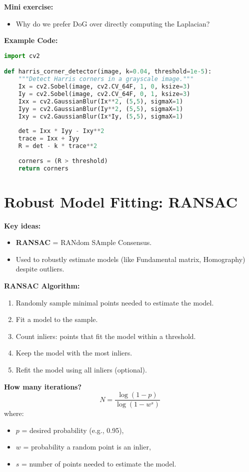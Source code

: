 \documentclass[a4paper,11pt]{article}
\begin{document}
\textbf{Mini exercise:}
\begin{itemize}
    \item Why do we prefer DoG over directly computing the Laplacian?
\end{itemize}

\vspace{1em}

\textbf{Example Code:}
\begin{lstlisting}[language=Python]
import cv2

def harris_corner_detector(image, k=0.04, threshold=1e-5):
    """Detect Harris corners in a grayscale image."""
    Ix = cv2.Sobel(image, cv2.CV_64F, 1, 0, ksize=3)
    Iy = cv2.Sobel(image, cv2.CV_64F, 0, 1, ksize=3)
    Ixx = cv2.GaussianBlur(Ix**2, (5,5), sigmaX=1)
    Iyy = cv2.GaussianBlur(Iy**2, (5,5), sigmaX=1)
    Ixy = cv2.GaussianBlur(Ix*Iy, (5,5), sigmaX=1)
    
    det = Ixx * Iyy - Ixy**2
    trace = Ixx + Iyy
    R = det - k * trace**2
    
    corners = (R > threshold)
    return corners
\end{lstlisting}

\newpage
\section{Robust Model Fitting: RANSAC}

\textbf{Key ideas:}
\begin{itemize}
    \item \textbf{RANSAC} = RANdom SAmple Consensus.
    \item Used to robustly estimate models (like Fundamental matrix, Homography) despite outliers.
\end{itemize}

\textbf{RANSAC Algorithm:}
\begin{enumerate}
    \item Randomly sample minimal points needed to estimate the model.
    \item Fit a model to the sample.
    \item Count inliers: points that fit the model within a threshold.
    \item Keep the model with the most inliers.
    \item Refit the model using all inliers (optional).
\end{enumerate}

\textbf{How many iterations?}
\[
N = \frac{\log(1 - p)}{\log(1 - w^s)}
\]
where:
\begin{itemize}
    \item $p$ = desired probability (e.g., 0.95),
    \item $w$ = probability a random point is an inlier,
    \item $s$ = number of points needed to estimate the model.
\end{itemize}
\end{document}
